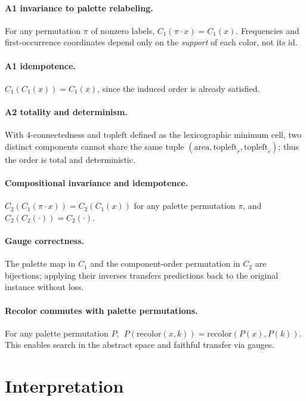 \documentclass[11pt]{article}
\begin{document}
\paragraph{A1 invariance to palette relabeling.}
For any permutation $\pi$ of nonzero labels, $C_1(\pi\!\cdot\!x)=C_1(x)$. Frequencies and first-occurrence coordinates depend only on the \emph{support} of each color, not its id.

\paragraph{A1 idempotence.}
$C_1(C_1(x))=C_1(x)$, since the induced order is already satisfied.

\paragraph{A2 totality and determinism.}
With 4-connectedness and $\mathrm{topleft}$ defined as the lexicographic minimum cell, two distinct components cannot share the same tuple $(\mathrm{area},\mathrm{topleft}_r,\mathrm{topleft}_c)$; thus the order is total and deterministic.

\paragraph{Compositional invariance and idempotence.}
$C_2(C_1(\pi\!\cdot\!x))=C_2(C_1(x))$ for any palette permutation $\pi$, and $C_2(C_2(\cdot))=C_2(\cdot)$.

\paragraph{Gauge correctness.}
The palette map in $C_1$ and the component-order permutation in $C_2$ are bijections; applying their inverses transfers predictions back to the original instance without loss.

\paragraph{Recolor commutes with palette permutations.}
For any palette permutation $P$, \(\;P(\mathrm{recolor}(x,k))=\mathrm{recolor}(P(x),P(k))\). This enables search in the abstract space and faithful transfer via gauges.

\section{Interpretation}
\end{document}
